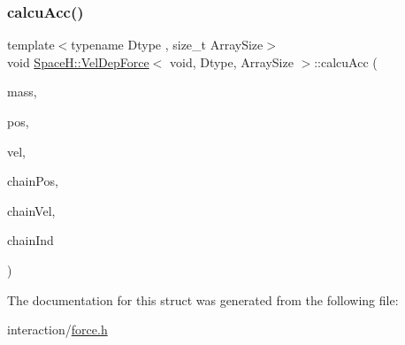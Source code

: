 \mbox{\label{struct_space_h_1_1_vel_dep_force_3_01void_00_01_dtype_00_01_array_size_01_4_a31ca17ff8f9683793b0d0d0438b5298d}} 
\subsubsection{\texorpdfstring{calcu\+Acc()}{calcuAcc()}\hspace{0.1cm}{\footnotesize\ttfamily [2/2]}}
{\footnotesize\ttfamily template$<$typename Dtype , size\+\_\+t Array\+Size$>$ \\
void \mbox{\hyperlink{struct_space_h_1_1_vel_dep_force}{Space\+H\+::\+Vel\+Dep\+Force}}$<$ void, Dtype, Array\+Size $>$\+::calcu\+Acc (\begin{DoxyParamCaption}\item[{const \mbox{\hyperlink{struct_space_h_1_1_vel_dep_force_3_01void_00_01_dtype_00_01_array_size_01_4_a3fdf665781fcc58227d1451b910aca63}{Scalar\+Array}} \&}]{mass,  }\item[{const \mbox{\hyperlink{struct_space_h_1_1_vel_dep_force_3_01void_00_01_dtype_00_01_array_size_01_4_ab9ab08040353afbaeeade8a442331b8d}{Vector\+Array}} \&}]{pos,  }\item[{const \mbox{\hyperlink{struct_space_h_1_1_vel_dep_force_3_01void_00_01_dtype_00_01_array_size_01_4_ab9ab08040353afbaeeade8a442331b8d}{Vector\+Array}} \&}]{vel,  }\item[{const \mbox{\hyperlink{struct_space_h_1_1_vel_dep_force_3_01void_00_01_dtype_00_01_array_size_01_4_ab9ab08040353afbaeeade8a442331b8d}{Vector\+Array}} \&}]{chain\+Pos,  }\item[{const \mbox{\hyperlink{struct_space_h_1_1_vel_dep_force_3_01void_00_01_dtype_00_01_array_size_01_4_ab9ab08040353afbaeeade8a442331b8d}{Vector\+Array}} \&}]{chain\+Vel,  }\item[{const \mbox{\hyperlink{struct_space_h_1_1_vel_dep_force_3_01void_00_01_dtype_00_01_array_size_01_4_a58bb8d2f9a35c3d16ed717ea3e13427d}{Index\+Array}} \&}]{chain\+Ind }\end{DoxyParamCaption})\hspace{0.3cm}{\ttfamily [inline]}}



The documentation for this struct was generated from the following file\+:\begin{DoxyCompactItemize}
\item 
interaction/\mbox{\hyperlink{force_8h}{force.\+h}}\end{DoxyCompactItemize}
